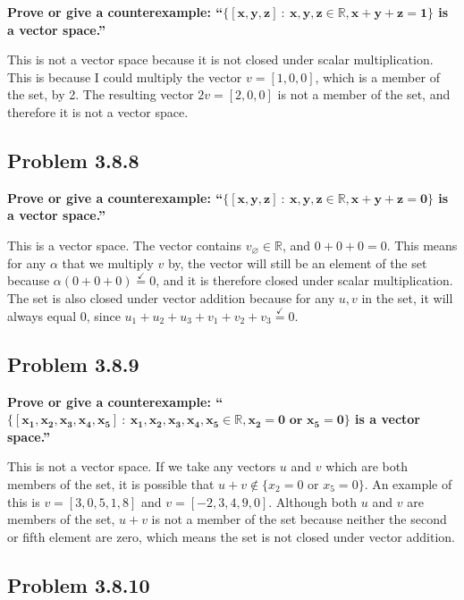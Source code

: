\documentclass[
  letterpaper,
  DIV=11,
  numbers=noendperiod]{scrartcl}
\begin{document}
\textbf{Prove or give a counterexample:
``\(\bm{\{[x, y, z] \ : \ x, y, z \in \mathbb{R}, x+y+z=1\}}\) is a
vector space.''}

This is not a vector space because it is not closed under scalar
multiplication. This is because I could multiply the vector
\(v = [1, 0, 0]\), which is a member of the set, by 2. The resulting
vector \(2v = [2, 0, 0]\) is not a member of the set, and therefore it
is not a vector space.

\hypertarget{problem-3.8.8}{%
\subsection{Problem 3.8.8}\label{problem-3.8.8}}

\textbf{Prove or give a counterexample:
``\(\bm{\{[x, y, z] \ : \ x, y, z \in \mathbb{R}, x+y+z=0\}}\) is a
vector space.''}

This is a vector space. The vector contains
\(v_\varnothing \in \mathbb{R}\), and \(0 + 0 + 0 = 0\). This means for
any \(\alpha\) that we multiply \(v\) by, the vector will still be an
element of the set because \(\alpha(0+0+0) \stackrel{\checkmark}{=} 0\),
and it is therefore closed under scalar multiplication. The set is also
closed under vector addition because for any \(u, v\) in the set, it
will always equal 0, since
\(u_1+u_2+u_3+v_1+v_2+v_3 \stackrel{\checkmark}{=} 0\).

\hypertarget{problem-3.8.9}{%
\subsection{Problem 3.8.9}\label{problem-3.8.9}}

\textbf{Prove or give a counterexample:
``\(\bm{\{[x_1, x_2, x_3, x_4, x_5] \ : \ x_1, x_2, x_3, x_4, x_5 \in \mathbb{R}, x_2 = 0 \text{ or } x_5 = 0 \}}\)
is a vector space.''}

This is not a vector space. If we take any vectors \(u\) and \(v\) which
are both members of the set, it is possible that
\(u + v \not \in \{x_2 = 0 \text{ or } x_5 = 0\}\). An example of this
is \(v=[3, 0, 5, 1, 8]\) and \(v=[-2, 3, 4, 9, 0]\). Although both \(u\)
and \(v\) are members of the set, \(u+v\) is not a member of the set
because neither the second or fifth element are zero, which means the
set is not closed under vector addition.

\hypertarget{problem-3.8.10}{%
\subsection{Problem 3.8.10}\label{problem-3.8.10}}
\end{document}
